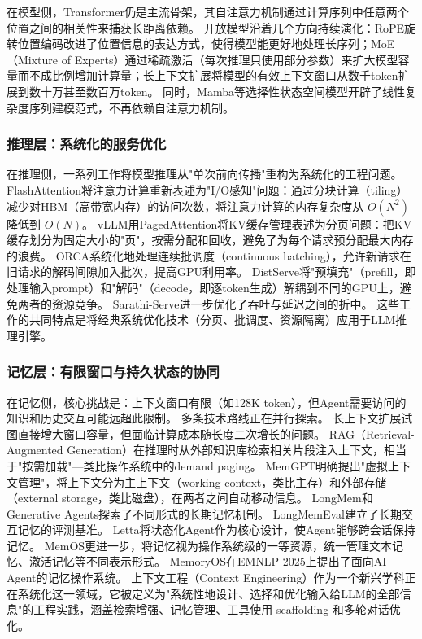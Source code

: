 在模型侧，Transformer\cite{vaswani2017attention}仍是主流骨架，其自注意力机制通过计算序列中任意两个位置之间的相关性来捕获长距离依赖。
开放模型沿着几个方向持续演化：RoPE旋转位置编码\cite{su2021roformer}改进了位置信息的表达方式，使得模型能更好地处理长序列；MoE（Mixture of Experts）\cite{switch2022,mixtral2024}通过稀疏激活（每次推理只使用部分参数）来扩大模型容量而不成比例增加计算量；长上下文扩展\cite{yarn2024,longrope2024}将模型的有效上下文窗口从数千token扩展到数十万甚至数百万token。
同时，Mamba\cite{gu2024mamba}等选择性状态空间模型开辟了线性复杂度序列建模范式，不再依赖自注意力机制。

\subsubsection{推理层：系统化的服务优化}

在推理侧，一系列工作将模型推理从"单次前向传播"重构为系统化的工程问题。
FlashAttention\cite{dao2022flashattention,dao2023flashattention2}将注意力计算重新表述为"I/O感知"问题：通过分块计算（tiling）减少对HBM（高带宽内存）的访问次数，将注意力计算的内存复杂度从 $O(N^2)$ 降低到 $O(N)$。
vLLM用PagedAttention\cite{kwon2023pagedattention}将KV缓存管理表述为分页问题：把KV缓存划分为固定大小的"页"，按需分配和回收，避免了为每个请求预分配最大内存的浪费。
ORCA\cite{orca2022}系统化地处理连续批调度（continuous batching），允许新请求在旧请求的解码间隙加入批次，提高GPU利用率。
DistServe\cite{zhong2024distserve}将"预填充"（prefill，即处理输入prompt）和"解码"（decode，即逐token生成）解耦到不同的GPU上，避免两者的资源竞争。
Sarathi-Serve\cite{agrawal2024sarathi}进一步优化了吞吐与延迟之间的折中。
这些工作的共同特点是将经典系统优化技术（分页、批调度、资源隔离）应用于LLM推理引擎。

\subsubsection{记忆层：有限窗口与持久状态的协同}

在记忆侧，核心挑战是：上下文窗口有限（如128K token），但Agent需要访问的知识和历史交互可能远超此限制。
多条技术路线正在并行探索。
长上下文扩展\cite{gemini2024,yarn2024}试图直接增大窗口容量，但面临计算成本随长度二次增长的问题。
RAG（Retrieval-Augmented Generation）\cite{lewis2020rag}在推理时从外部知识库检索相关片段注入上下文，相当于"按需加载"---类比操作系统中的demand paging。
MemGPT\cite{memgpt2023}明确提出"虚拟上下文管理"，将上下文分为主上下文（working context，类比主存）和外部存储（external storage，类比磁盘），在两者之间自动移动信息。
LongMem\cite{longmem2023}和Generative Agents\cite{park2023generativeagents}探索了不同形式的长期记忆机制。
LongMemEval\cite{longmemeval2024}建立了长期交互记忆的评测基准。
Letta\cite{letta_stateful_2026}将状态化Agent作为核心设计，使Agent能够跨会话保持记忆。
MemOS\cite{memos2025}更进一步，将记忆视为操作系统级的一等资源，统一管理文本记忆、激活记忆等不同表示形式。
MemoryOS\cite{memoryos2025}在EMNLP 2025上提出了面向AI Agent的记忆操作系统。
上下文工程（Context Engineering）\cite{contextengineer_survey2025}作为一个新兴学科正在系统化这一领域，它被定义为"系统性地设计、选择和优化输入给LLM的全部信息"的工程实践，涵盖检索增强、记忆管理、工具使用 scaffolding 和多轮对话优化。

